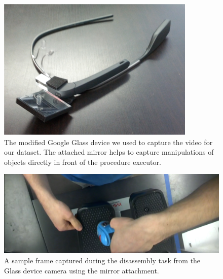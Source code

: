 \documentclass[10pt,twocolumn,letterpaper]{article}
\begin{document}
\begin{figure}[!b]
    \centering
    \includegraphics[width=\columnwidth]{fig/glass.png}
    \caption{The modified Google Glass device we used to capture the video for our dataset. The attached mirror helps to capture manipulations of objects directly in front of the procedure executor.}
    \label{fig:glass}
\end{figure}



\begin{figure}[!b]
    \centering
    \includegraphics[width=\columnwidth]{fig/legomyegocentricview.png}
    \caption{A sample frame captured during the disassembly task from the Glass device camera using the mirror attachment.}
    \label{fig:egocentric}
\end{figure}
\end{document}
